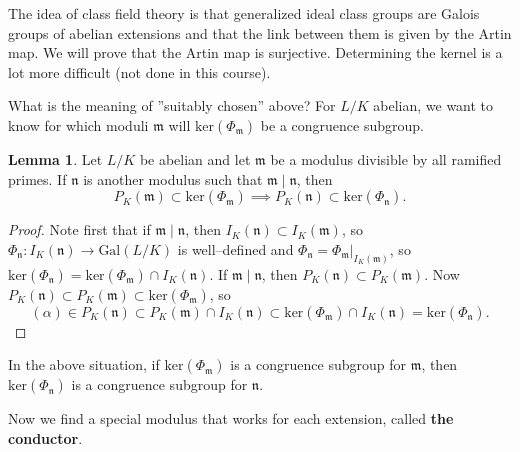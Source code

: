 \documentclass{article}
\theoremstyle{definition}
\newtheorem{lemma}[theorem]{Lemma}
\begin{document}
The idea of class field theory is that generalized ideal class groups are Galois groups of abelian extensions and that the link between them is given by the Artin map. We will prove that the Artin map is surjective. Determining the kernel is a lot more difficult (not done in this course).
\vspace{1mm}
 
What is the meaning of ''suitably chosen'' above? For $L/K$ abelian, we want to know for which moduli $\mathfrak{m}$ will $\text{ker}(\Phi_\mathfrak{m})$ be a congruence subgroup.
\begin{lemma}
    Let $L/K$ be abelian and let $\mathfrak{m}$ be a modulus divisible by all ramified primes. If $\mathfrak{n}$ is another modulus such that $\mathfrak{m} \mid \mathfrak{n}$, then \[
    P_K(\mathfrak{m}) \subset \text{ker}(\Phi_{\mathfrak{m}}) \implies P_K(\mathfrak{n}) \subset  \text{ker}(\Phi_{\mathfrak{n}}).
    \]
\end{lemma}
\begin{proof}
    Note first that if $\mathfrak{m} \mid \mathfrak{n}$, then $I_K(\mathfrak{n}) \subset I_K(\mathfrak{m})$, so $\Phi_\mathfrak{n} : I_K(\mathfrak{n}) \to \text{Gal}(L/K)$ is well--defined and $\Phi_{\mathfrak{n}} = \Phi_{\mathfrak{m}}|_{I_K(\mathfrak{m})}$, so $\text{ker}(\Phi_{\mathfrak{n}}) = \text{ker}(\Phi_{\mathfrak{m}}) \cap I_K(\mathfrak{n})$. If $\mathfrak{m} \mid \mathfrak{n}$, then $P_K(\mathfrak{n}) \subset P_K(\mathfrak{m})$. Now $P_K(\mathfrak{n}) \subset P_K(\mathfrak{m}) \subset \text{ker}(\Phi_{\mathfrak{m}})$, so \[
        (\alpha) \in P_K(\mathfrak{n}) \subset P_K(\mathfrak{m}) \cap I_K(\mathfrak{n}) \subset \text{ker}(\Phi_{\mathfrak{m}}) \cap I_K(\mathfrak{n}) = \text{ker}(\Phi_{\mathfrak{n}}).
    \]
\end{proof}
In the above situation, if $\text{ker}(\Phi_{\mathfrak{m}})$ is a congruence subgroup for $\mathfrak{m}$, then $\text{ker}(\Phi_{\mathfrak{n}})$ is a congruence subgroup for $\mathfrak{n}$.
\vspace{1mm}
 
Now we find a special modulus that works for each extension, called \textbf{the conductor}. 

\end{document}
